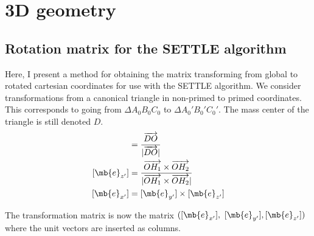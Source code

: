 \chapter{3D geometry}

\section{Rotation matrix for the SETTLE algorithm}
Here, I present a method for obtaining the matrix transforming from global to rotated cartesian coordinates for use with the SETTLE algorithm. We consider transformations from a canonical triangle in non-primed to primed coordinates. This corresponds to going from $\Delta A_0B_0C_0$ to $\Delta A_0' B_0' C_0'$. The mass center of the triangle is still denoted $D$.
\begin{align}
[\mb{e}_{y'}] &= \frac{\overrightarrow{DO}}{|\overrightarrow{DO}|} \\
[\mb{e}_{z'}] &= \frac{\overrightarrow{OH_1} \times \overrightarrow{OH_2} }{ | \overrightarrow{OH_1} \times \overrightarrow{OH_2}|} \\
[\mb{e}_{x'}] &= [\mb{e}_{y'}] \times [\mb{e}_{z'}]
\end{align}

The transformation matrix is now the matrix $( [\mb{e}_{x'}], [\mb{e}_{y'}],  [\mb{e}_{z'}] )$ where the unit vectors are inserted as columns.